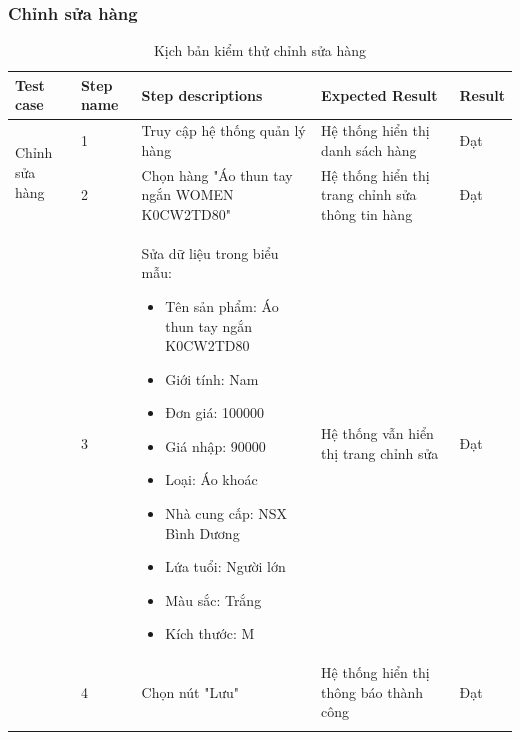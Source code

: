 \subsubsection{Chỉnh sửa hàng}
{
    \setlength\extrarowheight{6pt}
    \begin{longtable}{| p{2.5cm}| p{1cm}| p{5.5cm}| p{4.5cm} | p{1.5cm} |}
        \hline
        \textbf{Test case}                             & \textbf{Step name}                    & \textbf{Step descriptions}                   & \textbf{Expected Result}                         & \textbf{Result} \\
        \hline
        \multirow[t]{2}{2.5cm}{Chỉnh sửa hàng}         & 1                                     & Truy cập hệ thống quản lý hàng               & Hệ thống hiển thị danh sách hàng                 & Đạt             \\
        \cline{2-5}
                                                       & 2                                     & Chọn hàng "Áo thun tay ngắn WOMEN K0CW2TD80" & Hệ thống hiển thị trang chỉnh sửa thông tin hàng & Đạt             \\
        \cline{2-5}
                                                       & 3                                     & Sửa dữ liệu trong biểu mẫu:
        \begin{itemize}
            \item Tên sản phẩm: Áo thun tay ngắn K0CW2TD80
            \item Giới tính: Nam
            \item Đơn giá: 100000
            \item Giá nhập: 90000
            \item Loại: Áo khoác
            \item Nhà cung cấp: NSX Bình Dương
            \item Lứa tuổi: Người lớn
            \item Màu sắc: Trắng
            \item Kích thước: M
        \end{itemize} & Hệ thống vẫn hiển thị trang chỉnh sửa & Đạt                                                                                                                                                \\
        \cline{2-5}
                                                       & 4                                     & Chọn nút "Lưu"                               & Hệ thống hiển thị thông báo thành công           & Đạt             \\
        \hline
        \caption{Kịch bản kiểm thử chỉnh sửa hàng}
    \end{longtable}
}

